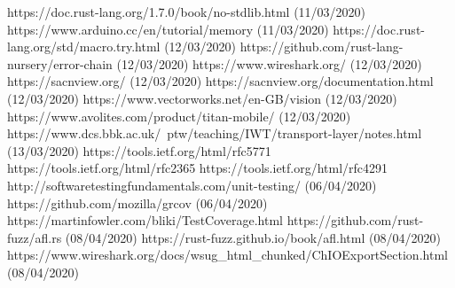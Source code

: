 \documentclass[11pt,a4paper]{report}
\begin{document}
\begin{thebibliography}{9}
	https://doc.rust-lang.org/1.7.0/book/no-stdlib.html (11/03/2020)
	https://www.arduino.cc/en/tutorial/memory (11/03/2020)
	https://doc.rust-lang.org/std/macro.try.html (12/03/2020)
	https://github.com/rust-lang-nursery/error-chain (12/03/2020)
	https://www.wireshark.org/ (12/03/2020)		
	https://sacnview.org/ (12/03/2020)
	https://sacnview.org/documentation.html (12/03/2020)
	https://www.vectorworks.net/en-GB/vision (12/03/2020)
	https://www.avolites.com/product/titan-mobile/ (12/03/2020)
	https://www.dcs.bbk.ac.uk/~ptw/teaching/IWT/transport-layer/notes.html (13/03/2020)
	https://tools.ietf.org/html/rfc5771
	https://tools.ietf.org/html/rfc2365
	https://tools.ietf.org/html/rfc4291
	http://softwaretestingfundamentals.com/unit-testing/ (06/04/2020)
	https://github.com/mozilla/grcov (06/04/2020)
	https://martinfowler.com/bliki/TestCoverage.html
	https://github.com/rust-fuzz/afl.rs (08/04/2020)
	https://rust-fuzz.github.io/book/afl.html (08/04/2020)
	https://www.wireshark.org/docs/wsug\_html\_chunked/ChIOExportSection.html (08/04/2020)
\end{thebibliography}
\end{document}

